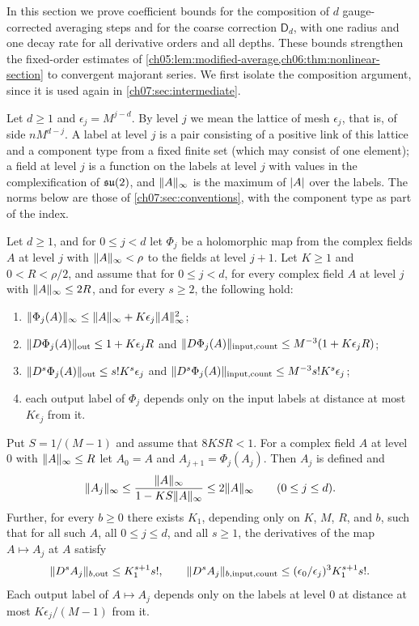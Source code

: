 In this section we prove coefficient bounds for the composition of $d$ gauge-corrected averaging steps and for the coarse correction $\mathsf D_d$, with one radius and one decay rate for all derivative orders and all depths. These bounds strengthen the fixed-order estimates of \cref{ch05:lem:modified-average,ch06:thm:nonlinear-section} to convergent majorant series. We first isolate the composition argument, since it is used again in \cref{ch07:sec:intermediate}.

Let $d\ge1$ and $\epsilon_j=M^{j-d}$. By level $j$ we mean the lattice of mesh $\epsilon_j$, that is, of side $nM^{d-j}$. A label at level $j$ is a pair consisting of a positive link of this lattice and a component type from a fixed finite set (which may consist of one element); a field at level $j$ is a function on the labels at level $j$ with values in the complexification of $\mathfrak{su}(2)$, and $\lVert A\rVert_\infty$ is the maximum of $\lvert A\rvert$ over the labels. The norms below are those of \cref{ch07:sec:conventions}, with the component type as part of the index.

\begin{lemma}\label{ch07:lem:composition-majorant}
Let $d\ge1$, and for $0\le j<d$ let $\Phi_j$ be a holomorphic map from the complex fields $A$ at level $j$ with $\lVert A\rVert_\infty<\rho$ to the fields at level $j+1$. Let $K\ge1$ and $0<R<\rho/2$, and assume that for $0\le j<d$, for every complex field $A$ at level $j$ with $\lVert A\rVert_\infty\le2R$, and for every $s\ge2$, the following hold:
\begin{enumerate}
\item $\lVert \Phi_j(A)\rVert_\infty\le\lVert A\rVert_\infty+K\epsilon_j\lVert A\rVert_\infty^2$;
\item $\lVert D\Phi_j(A)\rVert_{\mathrm{out}}\le1+K\epsilon_jR$ and $\lVert D\Phi_j(A)\rVert_{\mathrm{input,count}}\le M^{-3}(1+K\epsilon_jR)$;
\item $\lVert D^s\Phi_j(A)\rVert_{\mathrm{out}}\le s!K^s\epsilon_j$ and $\lVert D^s\Phi_j(A)\rVert_{\mathrm{input,count}}\le M^{-3}s!K^s\epsilon_j$;
\item each output label of $\Phi_j$ depends only on the input labels at distance at most $K\epsilon_j$ from it.
\end{enumerate}
Put $S=1/(M-1)$ and assume that $8KSR<1$. For a complex field $A$ at level $0$ with $\lVert A\rVert_\infty\le R$ let $A_0=A$ and $A_{j+1}=\Phi_j(A_j)$. Then $A_j$ is defined and
\[
 \lVert A_j\rVert_\infty\le\frac{\lVert A\rVert_\infty}{1-KS\lVert A\rVert_\infty}\le2\lVert A\rVert_\infty\qquad(0\le j\le d).
\]
Further, for every $b\ge0$ there exists $K_1$, depending only on $K$, $M$, $R$, and $b$, such that for all such $A$, all $0\le j\le d$, and all $s\ge1$, the derivatives of the map $A\mapsto A_j$ at $A$ satisfy
\[
 \lVert D^sA_j\rVert_{b,\mathrm{out}}\le K_1^{s+1}s!,\qquad
 \lVert D^sA_j\rVert_{b,\mathrm{input,count}}\le(\epsilon_0/\epsilon_j)^3K_1^{s+1}s!.
\]
Each output label of $A\mapsto A_j$ depends only on the labels at level $0$ at distance at most $K\epsilon_j/(M-1)$ from it.
\end{lemma}

